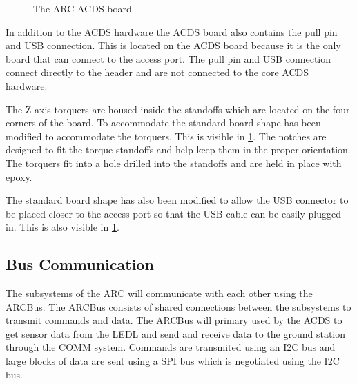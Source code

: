 \begin{figure}[!ht]
    \caption{The \ac{ARC} \ac{ACDS} board}
    \label{fig:boardPhoto}
\end{figure}

In addition to the \ac{ACDS} hardware the \ac{ACDS} board also contains the pull pin and \ac{USB} connection. This is located on the \ac{ACDS} board because it is the only board that can connect to the access port. The pull pin and \ac{USB} connection connect directly to the header and are not connected to the core \ac{ACDS} hardware. 

The Z-axis torquers are housed inside the standoffs which are located on the four corners of the board. To accommodate the standard board shape has been modified to accommodate the torquers. This is visible in \cref{fig:boardPhoto}. The notches are designed to fit the torque standoffs and help keep them in the proper orientation. The torquers fit into a hole drilled into the standoffs and are held in place with epoxy. 

The standard board shape has also been modified to allow the \ac{USB} connector to be placed closer to the access port so that the \ac{USB} cable can be easily plugged in. This is also visible in \cref{fig:boardPhoto}.

\subsection{Bus Communication}

The subsystems of the \ac{ARC} will communicate with each other using the ARCBus. The ARCBus consists of shared connections between the subsystems to transmit commands and data. The ARCBus will primary used by the \ac{ACDS} to get sensor data from the \ac{LEDL} and send and receive data to the ground station through the COMM system. Commands are transmited using an \ac{I2C} bus and large blocks of data are sent using a \ac{SPI} bus which is negotiated using the \ac{I2C} bus.


